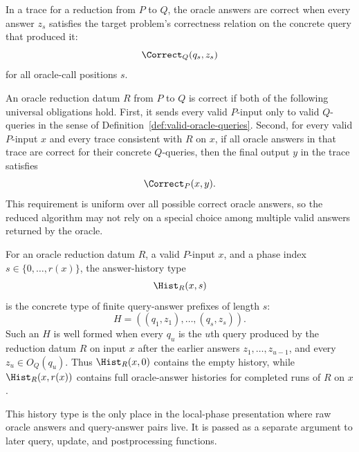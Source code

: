 \begin{definition}
  \label{def:correct-oracle-answers}
  In a trace for a reduction from $P$ to $Q$, the oracle answers are correct
  when every answer $z_s$ satisfies the target problem's correctness relation
  on the concrete query that produced it:
  \[
    \Correct_Q(q_s,z_s)
  \]
  for all oracle-call positions $s$.
\end{definition}

\begin{definition}
  \label{def:oracle-reduction-correctness}
  An oracle reduction datum $R$ from $P$ to $Q$ is correct if both of the
  following universal obligations hold.  First, it sends every valid $P$-input
  only to valid $Q$-queries in the sense of
  Definition~\ref{def:valid-oracle-queries}.  Second, for every valid
  $P$-input $x$ and every trace consistent with $R$ on $x$, if all oracle
  answers in that trace are correct for their concrete $Q$-queries, then the
  final output $y$ in the trace satisfies
  \[
    \Correct_P(x,y).
  \]
  This requirement is uniform over all possible correct oracle answers, so the
  reduced algorithm may not rely on a special choice among multiple valid
  answers returned by the oracle.
\end{definition}

\begin{definition}
  \label{def:oracle-reduction-answer-history}
  For an oracle reduction datum $R$, a valid $P$-input $x$, and a phase index
  $s\in\{0,\ldots,r(x)\}$, the answer-history type
  \[
    \Hist_R(x,s)
  \]
  is the concrete type of finite query-answer prefixes of length $s$:
  \[
    H=((q_1,z_1),\ldots,(q_s,z_s)).
  \]
  Such an $H$ is well formed when every $q_u$ is the $u$th query produced by
  the reduction datum $R$ on input $x$ after the earlier answers
  $z_1,\ldots,z_{u-1}$, and every $z_u\in O_Q(q_u)$.  Thus
  $\Hist_R(x,0)$ contains the empty history, while $\Hist_R(x,r(x))$ contains
  full oracle-answer histories for completed runs of $R$ on $x$.

  This history type is the only place in the local-phase presentation where
  raw oracle answers and query-answer pairs live.  It is passed as a separate
  argument to later query, update, and postprocessing functions.
\end{definition}

